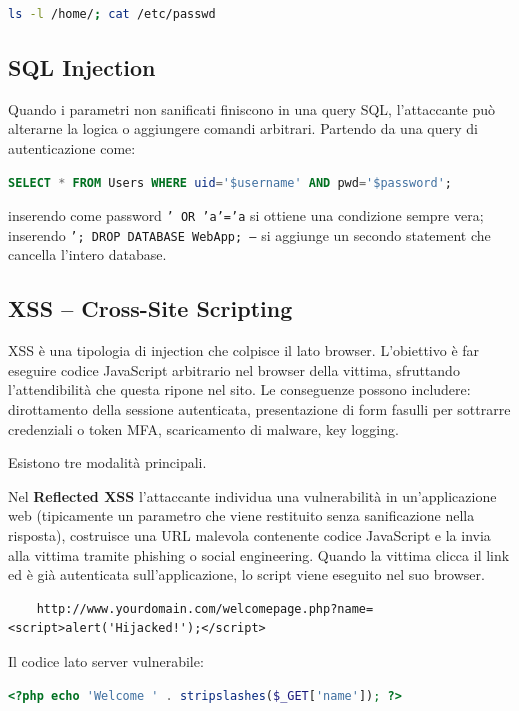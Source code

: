 \documentclass[12pt, a4paper]{report}
\begin{document}
\begin{lstlisting}[language=bash]
	ls -l /home/; cat /etc/passwd
\end{lstlisting}

\subsection{SQL Injection}
Quando i parametri non sanificati finiscono in una query SQL, l'attaccante può alterarne la logica o aggiungere comandi arbitrari. Partendo da una query di autenticazione come:

\begin{lstlisting}[language=sql]
	SELECT * FROM Users WHERE uid='$username' AND pwd='$password';
\end{lstlisting}

inserendo come password \texttt{' OR 'a'='a} si ottiene una condizione sempre vera; inserendo \texttt{'; DROP DATABASE WebApp; --} si aggiunge un secondo statement che cancella l'intero database.

\subsection{XSS – Cross-Site Scripting}
XSS è una tipologia di injection che colpisce il lato browser. L'obiettivo è far eseguire codice JavaScript arbitrario nel browser della vittima, sfruttando l'attendibilità che questa ripone nel sito. Le conseguenze possono includere: dirottamento della sessione autenticata, presentazione di form fasulli per sottrarre credenziali o token MFA, scaricamento di malware, key logging.

Esistono tre modalità principali.

Nel \textbf{Reflected XSS} l'attaccante individua una vulnerabilità in un'applicazione web (tipicamente un parametro che viene restituito senza sanificazione nella risposta), costruisce una URL malevola contenente codice JavaScript e la invia alla vittima tramite phishing o social engineering. Quando la vittima clicca il link ed è già autenticata sull'applicazione, lo script viene eseguito nel suo browser.

\begin{lstlisting}
	http://www.yourdomain.com/welcomepage.php?name=<script>alert('Hijacked!');</script>
\end{lstlisting}

Il codice lato server vulnerabile:

\begin{lstlisting}[language=php]
	<?php echo 'Welcome ' . stripslashes($_GET['name']); ?>
\end{lstlisting}
\end{document}
